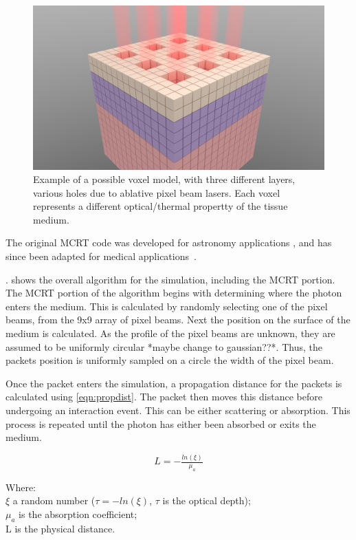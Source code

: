 \begin{figure}
\centering
\includegraphics[scale=0.25]{./ablation/images/voxel-model-render.png}
\caption{Example of a possible voxel model, with three different layers, various holes due to ablative pixel beam lasers. Each voxel represents a different optical/thermal propertty of the tissue medium.}\label{fig:voxel-model}
\end{figure}

The original MCRT code was developed for astronomy applications \cite{wood1999model,wood2005estimating}, and has since been adapted for medical applications~\cite{campbell2015monte,barnard2018quantifying}.

. shows the overall algorithm for the simulation, including the MCRT portion. 
The MCRT portion of the algorithm begins with determining where the photon enters the medium. This is calculated by randomly selecting one of the pixel beams, from the 9x9 array of pixel beams. Next the position on the surface of the medium is calculated. As the profile of the pixel beams are unknown, they are assumed to be uniformly circular *maybe change to gaussian??*. Thus, the packets position is uniformly sampled on a circle the width of the pixel beam.

Once the packet enters the simulation, a propagation distance for the packets is calculated using \cref{eqn:propdist}. The packet then moves this distance before undergoing an interaction event. This can be either scattering or absorption. This process is repeated until the photon has either been absorbed or exits the medium.

\begin{equation}
L = -\tfrac{ln(\xi)}{\mu_a}
\label{eqn:propdist}
\end{equation}

\noindent Where:\\
\indent $\xi$ a random number ($\tau = -ln(\xi)$, $\tau$ is the optical depth);\\
\indent $\mu_a$ is the absorption coefficient;\\
\indent L is the physical distance.\\


